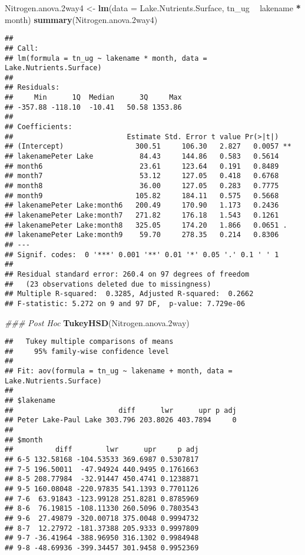 \documentclass[]{article}
\newenvironment{Shaded}{\begin{snugshade}}{\end{snugshade}}
\newcommand{\CommentTok}[1]{\textcolor[rgb]{0.56,0.35,0.01}{\textit{#1}}}
\newcommand{\DataTypeTok}[1]{\textcolor[rgb]{0.13,0.29,0.53}{#1}}
\newcommand{\FloatTok}[1]{\textcolor[rgb]{0.00,0.00,0.81}{#1}}
\newcommand{\KeywordTok}[1]{\textcolor[rgb]{0.13,0.29,0.53}{\textbf{#1}}}
\newcommand{\NormalTok}[1]{#1}
\newcommand{\OperatorTok}[1]{\textcolor[rgb]{0.81,0.36,0.00}{\textbf{#1}}}
\newcommand{\StringTok}[1]{\textcolor[rgb]{0.31,0.60,0.02}{#1}}
\begin{document}
\begin{Shaded}
\begin{Highlighting}[]
\NormalTok{Nitrogen.anova}\FloatTok{.2}\NormalTok{way4 <-}\StringTok{ }\KeywordTok{lm}\NormalTok{(}\DataTypeTok{data =}\NormalTok{ Lake.Nutrients.Surface, tn_ug }\OperatorTok{~}\StringTok{ }\NormalTok{lakename }\OperatorTok{*}\StringTok{ }\NormalTok{month)}
\KeywordTok{summary}\NormalTok{(Nitrogen.anova}\FloatTok{.2}\NormalTok{way4)}
\end{Highlighting}
\end{Shaded}

\begin{verbatim}
## 
## Call:
## lm(formula = tn_ug ~ lakename * month, data = Lake.Nutrients.Surface)
## 
## Residuals:
##     Min      1Q  Median      3Q     Max 
## -357.88 -118.10  -10.41   50.58 1353.86 
## 
## Coefficients:
##                           Estimate Std. Error t value Pr(>|t|)   
## (Intercept)                 300.51     106.30   2.827   0.0057 **
## lakenamePeter Lake           84.43     144.86   0.583   0.5614   
## month6                       23.61     123.64   0.191   0.8489   
## month7                       53.12     127.05   0.418   0.6768   
## month8                       36.00     127.05   0.283   0.7775   
## month9                      105.82     184.11   0.575   0.5668   
## lakenamePeter Lake:month6   200.49     170.90   1.173   0.2436   
## lakenamePeter Lake:month7   271.82     176.18   1.543   0.1261   
## lakenamePeter Lake:month8   325.05     174.20   1.866   0.0651 . 
## lakenamePeter Lake:month9    59.70     278.35   0.214   0.8306   
## ---
## Signif. codes:  0 '***' 0.001 '**' 0.01 '*' 0.05 '.' 0.1 ' ' 1
## 
## Residual standard error: 260.4 on 97 degrees of freedom
##   (23 observations deleted due to missingness)
## Multiple R-squared:  0.3285, Adjusted R-squared:  0.2662 
## F-statistic: 5.272 on 9 and 97 DF,  p-value: 7.729e-06
\end{verbatim}

\begin{Shaded}
\begin{Highlighting}[]
\CommentTok{### Post Hoc}
\KeywordTok{TukeyHSD}\NormalTok{(Nitrogen.anova}\FloatTok{.2}\NormalTok{way)}
\end{Highlighting}
\end{Shaded}

\begin{verbatim}
##   Tukey multiple comparisons of means
##     95% family-wise confidence level
## 
## Fit: aov(formula = tn_ug ~ lakename + month, data = Lake.Nutrients.Surface)
## 
## $lakename
##                         diff      lwr      upr p adj
## Peter Lake-Paul Lake 303.796 203.8026 403.7894     0
## 
## $month
##          diff        lwr      upr     p adj
## 6-5 132.58168 -104.53533 369.6987 0.5307817
## 7-5 196.50011  -47.94924 440.9495 0.1761663
## 8-5 208.77984  -32.91447 450.4741 0.1238871
## 9-5 160.08048 -220.97835 541.1393 0.7701126
## 7-6  63.91843 -123.99128 251.8281 0.8785969
## 8-6  76.19815 -108.11330 260.5096 0.7803543
## 9-6  27.49879 -320.00718 375.0048 0.9994732
## 8-7  12.27972 -181.37388 205.9333 0.9997809
## 9-7 -36.41964 -388.96950 316.1302 0.9984948
## 9-8 -48.69936 -399.34457 301.9458 0.9952369
\end{verbatim}
\end{document}
